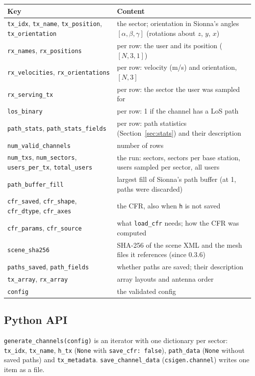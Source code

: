\documentclass{article}
\newcommand{\key}[1]{\texttt{#1}}
\begin{document}
\begin{center}
\small
\begin{tabularx}{\textwidth}{@{}lX@{}}
\toprule
Key & Content \\
\midrule
\texttt{tx\_idx}, \texttt{tx\_name}, \texttt{tx\_position}, \texttt{tx\_orientation} & the sector; orientation in Sionna's angles $[\alpha, \beta, \gamma]$ (rotations about $z$, $y$, $x$) \\
\texttt{rx\_names}, \texttt{rx\_positions} & per row: the user and its position ($[N, 3, 1]$) \\
\texttt{rx\_velocities}, \texttt{rx\_orientations} & per row: velocity (m/s) and orientation, $[N, 3]$ \\
\texttt{rx\_serving\_tx} & per row: the sector the user was sampled for \\
\texttt{los\_binary} & per row: 1 if the channel has a LoS path \\
\texttt{path\_stats}, \texttt{path\_stats\_fields} & per row: path statistics (Section~\ref{sec:stats}) and their description \\
\texttt{num\_valid\_channels} & number of rows \\
\texttt{num\_txs}, \texttt{num\_sectors}, \texttt{users\_per\_tx}, \texttt{total\_users} & the run: sectors, sectors per base station, users sampled per sector, all users \\
\texttt{path\_buffer\_fill} & largest fill of Sionna's path buffer (at 1, paths were discarded) \\
\texttt{cfr\_saved}, \texttt{cfr\_shape}, \texttt{cfr\_dtype}, \texttt{cfr\_axes} & the CFR, also when \texttt{h} is not saved \\
\texttt{cfr\_params}, \texttt{cfr\_source} & what \texttt{load\_cfr} needs; how the CFR was computed \\
\texttt{scene\_sha256} & SHA-256 of the scene XML and the mesh files it references (since 0.3.6) \\
\texttt{paths\_saved}, \texttt{path\_fields} & whether paths are saved; their description \\
\texttt{tx\_array}, \texttt{rx\_array} & array layouts and antenna order \\
\texttt{config} & the validated config \\
\bottomrule
\end{tabularx}
\end{center}

\subsection{Python API}
\texttt{generate\_channels(config)} is an iterator with one dictionary per sector: \texttt{tx\_idx}, \texttt{tx\_name}, \texttt{h\_tx} (\texttt{None} with \key{save\_cfr: false}), \texttt{path\_data} (\texttt{None} without saved paths) and \texttt{tx\_metadata}. \texttt{save\_channel\_data} (\texttt{csigen.channel}) writes one item as a file.
\end{document}
